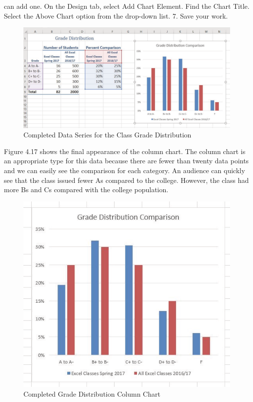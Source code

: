 can add one. On the Design tab, select Add Chart Element. Find the Chart Title. Select the
Above Chart option from the drop-down list.
7. Save your work.


\begin{figure}[H]
	\centering
	\includegraphics[width=\maxwidth{.95\linewidth}]{gfx/ch04_fig17}
	\caption{Completed Data Series for the Class Grade Distribution}
	\label{04:fig17}
\end{figure}





Figure 4.17 shows the final appearance of the column chart. The column chart is an appropriate type
for this data because there are fewer than twenty data points and we can easily see the comparison
for each category. An audience can quickly see that the class issued fewer As compared to the college.
However, the class had more Bs and Cs compared with the college population.


\begin{figure}[H]
	\centering
	\includegraphics[width=\maxwidth{.95\linewidth}]{gfx/ch04_fig18}
	\caption{Completed Grade Distribution Column Chart}
	\label{04:fig18}
\end{figure}

